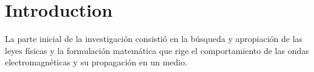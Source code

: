 \section{Introduction}
La parte inicial de la investigación consistió en la búsqueda y apropiación 
de las leyes físicas y la formulación matemática que rige el comportamiento 
de las ondas electromagnéticas y su propagación en un medio.
